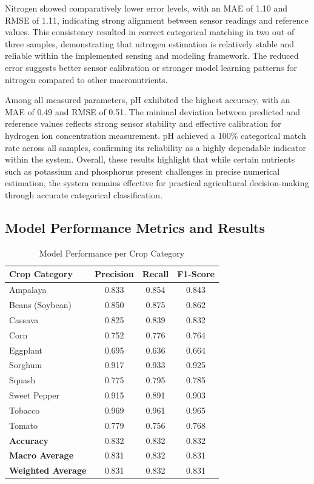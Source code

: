 {	Nitrogen showed comparatively lower error levels, with an MAE of 1.10 and RMSE of 1.11, indicating strong alignment between sensor readings and reference values. This consistency resulted in correct categorical matching in two out of three samples, demonstrating that nitrogen estimation is relatively stable and reliable within the implemented sensing and modeling framework. The reduced error suggests better sensor calibration or stronger model learning patterns for nitrogen compared to other macronutrients.
	
	Among all measured parameters, pH exhibited the highest accuracy, with an MAE of 0.49 and RMSE of 0.51. The minimal deviation between predicted and reference values reflects strong sensor stability and effective calibration for hydrogen ion concentration measurement. pH achieved a 100\% categorical match rate across all samples, confirming its reliability as a highly dependable indicator within the system. Overall, these results highlight that while certain nutrients such as potassium and phosphorus present challenges in precise numerical estimation, the system remains effective for practical agricultural decision-making through accurate categorical classification.
	
	\subsection{Model Performance Metrics and Results}
	
	\begin{table}[htbp]
		\centering
		\caption{Model Performance per Crop Category}
		\label{tab:crop_performance}
		\begin{tabular}{lccc}
			\toprule
			\textbf{Crop Category} & \textbf{Precision} & \textbf{Recall} & \textbf{F1-Score} \\
			\midrule
			Ampalaya        & 0.833 & 0.854 & 0.843 \\
			Beans (Soybean) & 0.850 & 0.875 & 0.862 \\
			Cassava         & 0.825 & 0.839 & 0.832 \\
			Corn            & 0.752 & 0.776 & 0.764 \\
			Eggplant        & 0.695 & 0.636 & 0.664 \\
			Sorghum         & 0.917 & 0.933 & 0.925 \\
			Squash          & 0.775 & 0.795 & 0.785 \\
			Sweet Pepper    & 0.915 & 0.891 & 0.903 \\
			Tobacco         & 0.969 & 0.961 & 0.965 \\
			Tomato          & 0.779 & 0.756 & 0.768 \\
			\midrule
			\textbf{Accuracy}         & 0.832 & 0.832 & 0.832 \\
			\textbf{Macro Average}    & 0.831 & 0.832 & 0.831 \\
			\textbf{Weighted Average} & 0.831 & 0.832 & 0.831 \\
			\bottomrule
		\end{tabular}
	\end{table}
	
}
